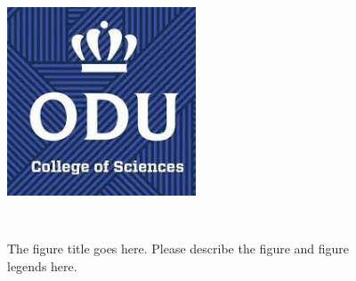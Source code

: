 \begin{figure}[tbh]
  \centering
  \includegraphics[height=8cm, width=0.5\textwidth]{Figures/cos1.jpeg}
  \caption[The figure title goes here.]{The figure title goes here. Please describe the figure and figure legends here.}
  \label{fig:cos1}
\end{figure}





